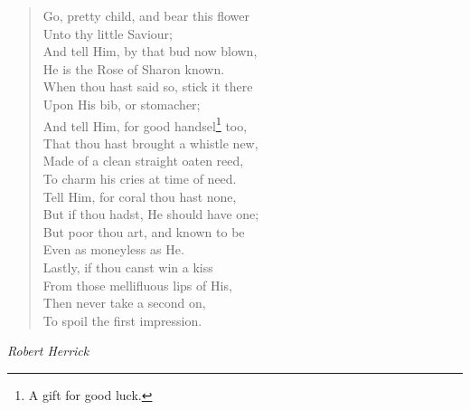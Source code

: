 
\begin{verse}
Go, pretty child, and bear this flower\\
Unto thy little Saviour;\\
And tell Him, by that bud now blown,\\
He is the Rose of Sharon known.\\
When thou hast said so, stick it there\\
Upon His bib, or stomacher;\\
And tell Him, for good handsel\footnote{A gift for good luck.} too,\\
That thou hast brought a whistle new,\\
Made of a clean straight oaten reed,\\
To charm his cries at time of need.\\
Tell Him, for coral thou hast none,\\
But if thou hadst, He should have one;\\
But poor thou art, and known to be\\
Even as moneyless as He.\\
Lastly, if thou canst win a kiss\\
From those mellifluous lips of His,\\
Then never take a second on,\\
To spoil the first impression.%
\end{verse}

\vspace{0.5\baselineskip}
\noindent\textit{Robert Herrick}

\newpage
